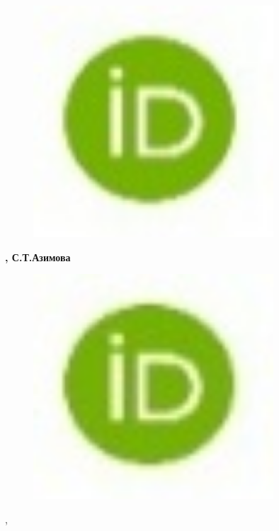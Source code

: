 \begin{figure}[H]
	\centering
	\includegraphics[width=0.8\textwidth]{media/pish2/image77}
	\caption*{}
\end{figure}
{\bfseries ,
С.Т.Азимова}
\begin{figure}[H]
	\centering
	\includegraphics[width=0.8\textwidth]{media/pish2/image78}
	\caption*{}
\end{figure}
,

